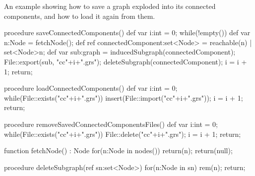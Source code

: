 \begin{example}
An example showing how to save a graph exploded into its connected components, and how to load it again from them.
\begin{grgen}
procedure saveConnectedComponents()
{
	def var i:int = 0;
	while(!empty()) {
		def var n:Node = fetchNode();
		def ref connectedComponent:set<Node> = reachable(n) | set<Node>{n};
		def var sub:graph = inducedSubgraph(connectedComponent);
		File::export(sub, "cc"+i+".grs");
		deleteSubgraph(connectedComponent);
		i = i + 1;
	}
	return;
}

procedure loadConnectedComponents()
{
	def var i:int = 0;
	while(File::exists("cc"+i+".grs")) {
		insert(File::import("cc"+i+".grs"));
		i = i + 1;
	}
	return;
}

procedure removeSavedConnectedComponentsFiles()
{
	def var i:int = 0;
	while(File::exists("cc"+i+".grs")) {
		File::delete("cc"+i+".grs");
		i = i + 1;
	}
	return;
}

function fetchNode() : Node
{
	for(n:Node in nodes()) {
		return(n);
	}
	return(null);
}

procedure deleteSubgraph(ref sn:set<Node>)
{
	for(n:Node in sn) {
		rem(n);
	}
	return;
}
\end{grgen}
\end{example}

